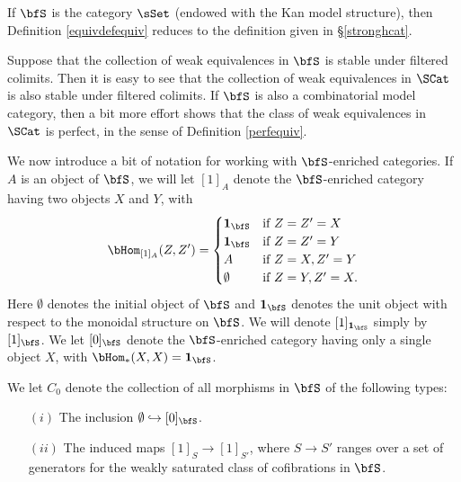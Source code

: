 \begin{Simplicial Categories}
\begin{remark}
If $\bfS$ is the category $\sSet$ (endowed with the Kan model structure), then Definition \ref{equivdefequiv} reduces to the definition given in \S \ref{stronghcat}.
\end{remark}

\begin{remark}\label{swunk}
Suppose that the collection of  weak equivalences in $\bfS$ is stable under filtered colimits.
Then it is easy to see that the collection of weak equivalences in $\SCat$ is also stable under filtered colimits. If $\bfS$ is also a combinatorial model category, then a bit more effort shows that
the class of weak equivalences in $\SCat$ is perfect, in the sense of Definition \ref{perfequiv}.
\end{remark}

We now introduce a bit of notation for working with $\bfS$-enriched categories. If $A$ is an object of $\bfS$, we will let $[1]_{A}$ denote the $\bfS$-enriched category having two objects $X$ and $Y$, with
$$ \bHom_{[1]_{A}}(Z,Z') = \begin{cases} {\bf 1}_{\bfS} & \text{if } Z=Z'=X \\
{\bf 1}_{\bfS} & \text{if } Z=Z'=Y \\
A & \text{if } Z=X, Z'=Y \\
\emptyset & \text{if } Z=Y, Z'=X.\end{cases}$$
Here $\emptyset$ denotes the initial object of $\bfS$ and ${\bf 1}_{\bfS}$ denotes the
unit object with respect to the monoidal structure on $\bfS$. We will denote
$[1]_{ {\bf 1}_{\bfS} }$ simply by $[1]_{\bfS}$. 
We let $[0]_{\bfS}$ denote the $\bfS$-enriched category having only a single object $X$, with $\bHom_{\ast}(X,X)={\bf 1}_{\bfS}$.

We let $C_0$ denote the collection of all morphisms in $\bfS$ of the following types:
\begin{itemize}
\item[$(i)$] The inclusion $\emptyset \hookrightarrow [0]_{\bfS}$.
\item[$(ii)$] The induced maps $[1]_{S} \rightarrow [1]_{S'}$, where
$S \rightarrow S'$ ranges over a set of generators for the weakly saturated class of
cofibrations in $\bfS$.
\end{itemize}


\end{Simplicial Categories}

